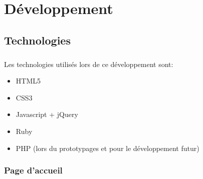 \documentclass[11pt,a4paper,twoside]{report}
\begin{document}
\chapter{Développement}
	\section{Technologies}
		\paragraph*{}Les technologies utilisés lors de ce développement sont:
			\begin{itemize}
				\item HTML5
				\item CSS3
				\item Javascript + jQuery
				\item Ruby
				\item PHP (lors du prototypages et pour le développement futur)
			\end{itemize}
		\subsection{Page d'accueil}
\end{document}
